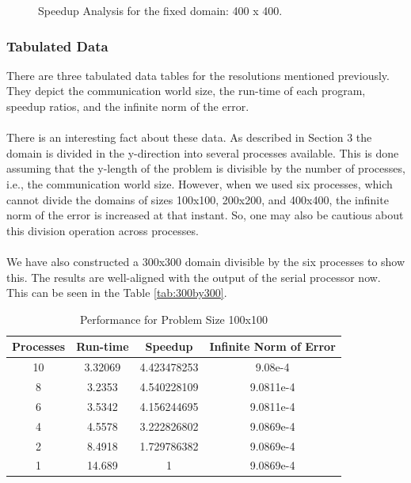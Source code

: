 \documentclass[12pt]{article}
\begin{document}
\begin{figure}[H]
\centering
{}
\caption{Speedup Analysis for the fixed domain: 400 x 400.}
\label{fig:7}
\end{figure}

\subsubsection{Tabulated Data}
There are three tabulated data tables for the resolutions mentioned previously. They depict the communication world size, the run-time of each program, speedup ratios, and the infinite norm of the error.\\\\
There is an interesting fact about these data. As described in Section 3 the domain is divided in the y-direction into several processes available. This is done assuming that the y-length of the problem is divisible by the number of processes, i.e., the communication world size. However, when we used six processes, which cannot divide the domains of sizes 100x100, 200x200, and 400x400, the infinite norm of the error is increased at that instant. So, one may also be cautious about this division operation across processes.\\\\
We have also constructed a 300x300 domain divisible by the six processes to show this. The results are well-aligned with the output of the serial processor now. This can be seen in the Table \ref{tab:300by300}.

\begin{table}[htbp]
\centering
\caption{Performance for Problem Size 100x100}
\begin{tabular}{@{} cccc @{}}
\toprule
Processes & Run-time & Speedup & Infinite Norm of Error\\
\midrule
10 & 3.32069 & 4.423478253 & 9.08e-4 \\
8 & 3.2353 & 4.540228109 & 9.0811e-4 \\
6 & 3.5342 & 4.156244695 & 9.0811e-4 \\
4 & 4.5578 & 3.222826802 & 9.0869e-4 \\
2 & 8.4918 & 1.729786382 & 9.0869e-4 \\
1 & 14.689 & 1 & 9.0869e-4 \\
\bottomrule
\end{tabular}
\end{table}
\end{document}
